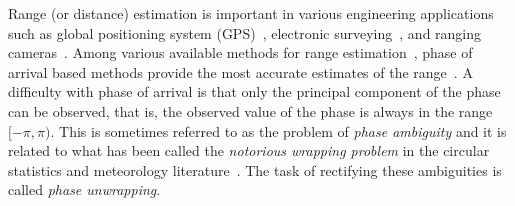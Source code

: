 Range (or distance) estimation is important in various engineering applications such as global positioning system (GPS)~\cite{Teunissen_GPS_LAMBDA_2006,Teunissen_GPS_1995}, electronic surveying~\cite{Jacobs_ambiguity_resolution_interferometery_1981, anderson1998surveying}, and ranging cameras~\cite{time_of_flight_cam_continuous_wave_2009,Arrigo_patent_2014}. Among various available methods for range estimation~\cite{Chitte_RSS_Estimation2009, HingCheung_RSSbasedRangeEstimation2012, XinrongLi_TOA_range_estimation2004, Lanzisera_TOA_range_estimation2011}, phase of arrival based methods provide the most accurate estimates of the range~\cite{Fauzia_POA_range_estimation2007, Povalac_POA_rangeestimation2011}. 
A difficulty with phase of arrival is that only the principal component of the phase can be observed, that is, the observed value of the phase is always in the range $[-\pi, \pi)$.    This is sometimes referred to as the problem of \emph{phase ambiguity} and it is related to what has been called the \emph{notorious wrapping problem} in the circular statistics and meteorology literature~\cite{Fisher1993}.  The task of rectifying these ambiguities is called \emph{phase unwrapping}. %


